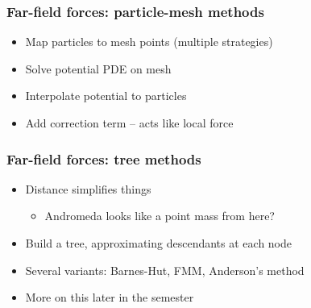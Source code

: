 \documentclass{beamer}
\begin{document}
\begin{frame}
  \frametitle{Far-field forces: particle-mesh methods}

  \begin{center}
    
  \end{center}
  
  \begin{itemize}
  \item Map particles to mesh points (multiple strategies)
  \item Solve potential PDE on mesh
  \item Interpolate potential to particles
  \item Add correction term -- acts like local force
  \end{itemize}

\end{frame}


\begin{frame}
  \frametitle{Far-field forces: tree methods}

  \begin{center}
    
  \end{center}
  \begin{itemize}
  \item Distance simplifies things
    \begin{itemize}
    \item Andromeda looks like a point mass from here?
    \end{itemize}
  \item Build a tree, approximating descendants at each node
  \item Several variants: Barnes-Hut, FMM, Anderson's method
  \item More on this later in the semester
  \end{itemize}
\end{frame}
\end{document}
